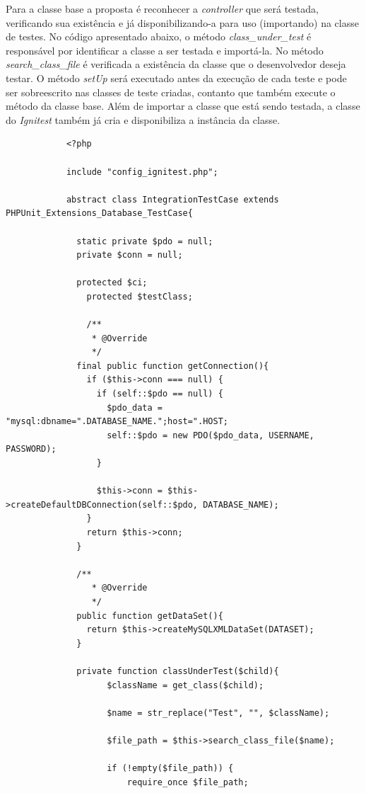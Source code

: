         Para a classe base a proposta é reconhecer a \textit{controller} que será testada, verificando sua existência e já disponibilizando-a para uso (importando) na classe de testes. No código apresentado abaixo, o método \textit{class\_under\_test} é responsável por identificar a classe a ser testada e importá-la. No método \textit{search\_class\_file} é verificada a existência da classe que o desenvolvedor deseja testar. O método \textit{setUp} será executado antes da execução de cada teste e pode ser sobreescrito nas classes de teste criadas, contanto que também execute o método da classe base. Além de importar a classe que está sendo testada, a classe do \textit{Ignitest} também já cria e disponibiliza a instância da classe.

        \begin{lstlisting}
            <?php

            include "config_ignitest.php";

            abstract class IntegrationTestCase extends PHPUnit_Extensions_Database_TestCase{

              static private $pdo = null;
              private $conn = null;

              protected $ci;
                protected $testClass;

                /**
                 * @Override
                 */
              final public function getConnection(){
                if ($this->conn === null) {
                  if (self::$pdo == null) {
                    $pdo_data = "mysql:dbname=".DATABASE_NAME.";host=".HOST;
                    self::$pdo = new PDO($pdo_data, USERNAME, PASSWORD);
                  }

                  $this->conn = $this->createDefaultDBConnection(self::$pdo, DATABASE_NAME);
                }
                return $this->conn;
              }

              /**
                 * @Override
                 */
              public function getDataSet(){
                return $this->createMySQLXMLDataSet(DATASET);
              }

              private function classUnderTest($child){
                    $className = get_class($child);

                    $name = str_replace("Test", "", $className);

                    $file_path = $this->search_class_file($name);

                    if (!empty($file_path)) {
                        require_once $file_path;


\end{lstlisting}
